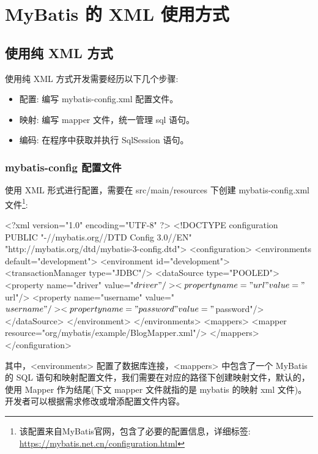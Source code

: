 \section{MyBatis 的 XML 使用方式}

\subsection{使用纯 XML 方式}

使用纯 XML 方式开发需要经历以下几个步骤:
\begin{itemize}
    \item 配置: 编写 mybatis-config.xml 配置文件。
    \item 映射: 编写 mapper 文件，统一管理 sql 语句。
    \item 编码: 在程序中获取并执行 SqlSession 语句。
\end{itemize}

\subsubsection{mybatis-config 配置文件}

使用 XML 形式进行配置，需要在 src/main/resources 下创建 mybatis-config.xml 文件\footnote{该配置来自MyBatis官网，包含了必要的配置信息，详细标签: \url{https://mybatis.net.cn/configuration.html}}:

\begin{xml}
<?xml version="1.0" encoding="UTF-8" ?>
<!DOCTYPE configuration
        PUBLIC "-//mybatis.org//DTD Config 3.0//EN"
        "http://mybatis.org/dtd/mybatis-3-config.dtd">
<configuration>
    <environments default="development">
        <environment id="development">
            <transactionManager type="JDBC"/>
            <dataSource type="POOLED">
                <property name="driver" value="${driver}"/>
                <property name="url" value="${url}"/>
                <property name="username" value="${username}"/>
                <property name="password" value="${password}"/>
            </dataSource>
        </environment>
    </environments>
    <mappers>
        <mapper resource="org/mybatis/example/BlogMapper.xml"/>
    </mappers>
</configuration>
\end{xml}

其中，<environments> 配置了数据库连接，<mappers> 中包含了一个 MyBatis 的 SQL 语句和映射配置文件，我们需要在对应的路径下创建映射文件，默认的，使用 Mapper 作为结尾(下文 mapper 文件就指的是 mybatis 的映射 xml 文件)。开发者可以根据需求修改或增添配置文件内容。

